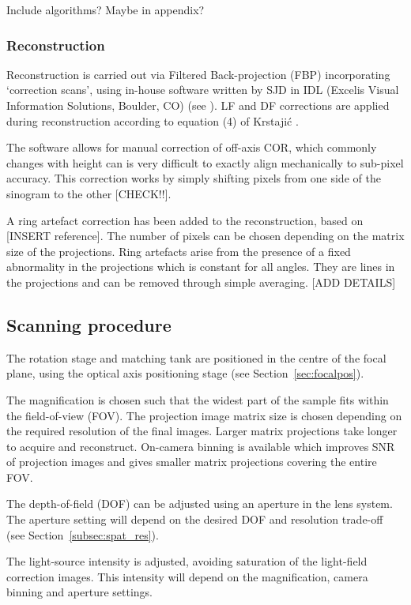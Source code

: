 Include algorithms? Maybe in appendix?

\subsubsection{Reconstruction}
Reconstruction is carried out via Filtered Back-projection (FBP) incorporating  `correction scans', using in-house software  written by  SJD in IDL (Excelis Visual Information Solutions, Boulder, CO) (see \cite{doranestablishing2013}). LF and DF corrections are applied during reconstruction according to  equation (4) of Krstaji\'{c} \cite{Krstajic:2007ec}.  


The software  allows for manual correction of off-axis COR, which commonly changes with height can is very difficult to exactly align mechanically to sub-pixel accuracy. This correction works by simply shifting pixels from one side of the sinogram to the other [CHECK!!]. 

A ring artefact correction has been added to the reconstruction, based on [INSERT reference]. The number of pixels can be chosen depending on the matrix size of the projections. Ring artefacts arise from the presence of a fixed abnormality in the projections which is constant for all angles. They are lines in the projections and can be removed through simple averaging. [ADD DETAILS]


\subsection{Scanning procedure}

The rotation stage and matching tank are positioned in the centre of the focal plane, using the optical axis positioning stage (see Section~\ref{sec:focalpos}).

The magnification is chosen such that the widest part of the sample fits within the  field-of-view (FOV). The projection image matrix size is chosen depending on the required resolution of the final images. Larger matrix projections take longer to acquire and reconstruct. On-camera binning is available which improves SNR of projection images and gives smaller matrix projections covering the entire FOV.

The depth-of-field (DOF) can be adjusted using an aperture in the lens system. The aperture setting will depend on the desired DOF and resolution trade-off (see Section~\ref{subsec:spat_res}).

The light-source intensity is adjusted, avoiding saturation of the  light-field correction images. This intensity will depend on the magnification, camera binning and aperture settings. 

